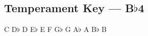 \subsection[Temperament Key]{Temperament Key --- \UiKey{\I}\UiKey{\SET}B$\flat$4}









































C
D$\flat$
D
E$\flat$
E
F
G$\flat$
G
A$\flat$
A
B$\flat$
B

